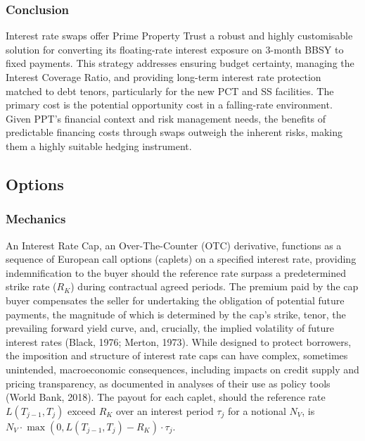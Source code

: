 \documentclass[11pt, a4paper, british]{article}
\begin{document}
\subsubsection{Conclusion}
Interest rate swaps offer Prime Property Trust a robust and highly customisable solution for converting its floating-rate interest exposure on 3-month BBSY to fixed payments. This strategy addresses ensuring budget certainty, managing the Interest Coverage Ratio, and providing long-term interest rate protection matched to debt tenors, particularly for the new PCT and SS facilities. The primary cost is the potential opportunity cost in a falling-rate environment. Given PPT's financial context and risk management needs, the benefits of predictable financing costs through swaps outweigh the inherent risks, making them a highly suitable hedging instrument.


\newpage

\subsection{Options}

\subsubsection{Mechanics}
An Interest Rate Cap, an Over-The-Counter (OTC) derivative, functions as a sequence of European call options (caplets) on a specified interest rate, providing indemnification to the buyer should the reference rate surpass a predetermined strike rate ($R_K$) during contractual agreed periods. The premium paid by the cap buyer compensates the seller for undertaking the obligation of potential future payments, the magnitude of which is determined by the cap's strike, tenor, the prevailing forward yield curve, and, crucially, the implied volatility of future interest rates (Black, 1976; Merton, 1973). While designed to protect borrowers, the imposition and structure of interest rate caps can have complex, sometimes unintended, macroeconomic consequences, including impacts on credit supply and pricing transparency, as documented in analyses of their use as policy tools (World Bank, 2018). The payout for each caplet, should the reference rate $L(T_{j-1}, T_j)$ exceed $R_K$ over an interest period $\tau_j$ for a notional $N_V$, is $N_V \cdot \max(0, L(T_{j-1}, T_j) - R_K) \cdot \tau_j$.

\end{document}
